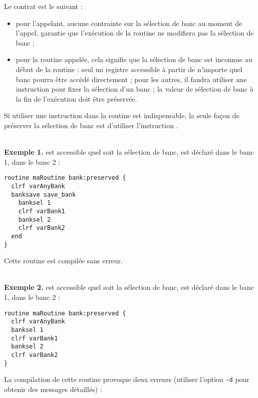 
Le contrat est le suivant :
\begin{itemize}
  \item pour l'appelant, aucune contrainte sur la sélection de banc au moment de l'appel, garantie que l'exécution de la routine ne modifiera pas la sélection de banc ; 
\item pour la routine appelée, cela signifie que la sélection de banc est inconnue au début de la routine : seul un registre accessible à partir de n'importe quel banc pourra être accédé directement ; pour les autres, il faudra utiliser une instruction  pour fixer la sélection d'un banc ; la valeur de sélection de banc à la fin de l'exécution doit être préservée.
\end{itemize}

Si utiliser une instruction  dans la routine est indispensable, la seule façon de préserver la sélection de banc est d'utiliser l'instruction . 

~\\
\textbf{Exemple 1.}  est accessible quel soit la sélection de banc,  est déclaré dans le banc 1,  dans le banc 2 :
\begin{lstlisting}[language=piccolo]
routine maRoutine bank:preserved {
  clrf varAnyBank
  banksave save_bank
    banksel 1
    clrf varBank1
    banksel 2
    clrf varBank2
  end
}
\end{lstlisting}

Cette routine est compilée sans erreur.


~\\
\textbf{Exemple 2.}  est accessible quel soit la sélection de banc,  est déclaré dans le banc 1,  dans le banc 2 :
\begin{lstlisting}[language=piccolo]
routine maRoutine bank:preserved {
  clrf varAnyBank
  banksel 1
  clrf varBank1
  banksel 2
  clrf varBank2
}
\end{lstlisting}

La compilation de cette routine provoque deux erreurs (utiliser l’option \texttt{-d} pour obtenir des messages détaillés) :

